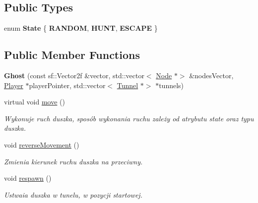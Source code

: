 \subsection*{Public Types}
\begin{DoxyCompactItemize}
\item 
\mbox{\label{classGhost_af712fc09f900832a0225928c4556234d}} 
enum {\bfseries State} \{ {\bfseries R\+A\+N\+D\+OM}, 
{\bfseries H\+U\+NT}, 
{\bfseries E\+S\+C\+A\+PE}
 \}
\end{DoxyCompactItemize}
\subsection*{Public Member Functions}
\begin{DoxyCompactItemize}
\item 
\mbox{\label{classGhost_aef285a078acbcc2aecf274fa7954709f}} 
{\bfseries Ghost} (const sf\+::\+Vector2f \&vector, std\+::vector$<$ \hyperlink{classNode}{Node} $\ast$$>$ \&nodes\+Vector, \hyperlink{classPlayer}{Player} $\ast$player\+Pointer, std\+::vector$<$ \hyperlink{classTunnel}{Tunnel} $\ast$$>$ $\ast$tunnels)
\item 
\mbox{\label{classGhost_afa1fedf2269c2e37fffc70b534b7fa2d}} 
virtual void \hyperlink{classGhost_afa1fedf2269c2e37fffc70b534b7fa2d}{move} ()
\begin{DoxyCompactList}\small\item\em Wykonuje ruch duszka, sposób wykonania ruchu zależy od atrybutu state oraz typu duszka. \end{DoxyCompactList}\item 
\mbox{\label{classGhost_aa08c3d40406bcdd8a61739a50b884b10}} 
void \hyperlink{classGhost_aa08c3d40406bcdd8a61739a50b884b10}{reverse\+Movement} ()
\begin{DoxyCompactList}\small\item\em Zmienia kierunek ruchu duszka na przeciwny. \end{DoxyCompactList}\item 
\mbox{\label{classGhost_a658d65b2041de18e5661582d5b1c334c}} 
void \hyperlink{classGhost_a658d65b2041de18e5661582d5b1c334c}{respawn} ()
\begin{DoxyCompactList}\small\item\em Ustwaia duszka w tunelu, w pozycji startowej. \end{DoxyCompactList}\item 

\end{DoxyCompactItemize}
